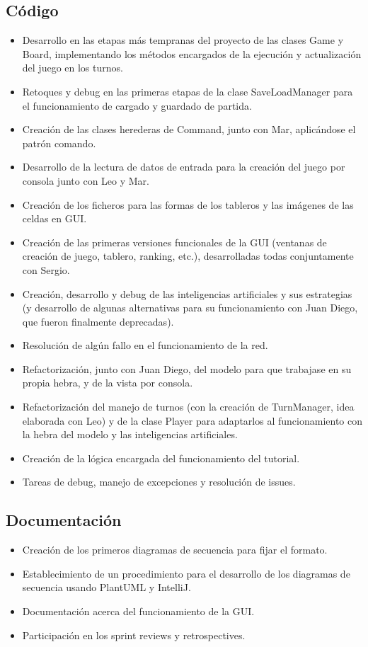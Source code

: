 \documentclass[../FINAL/Scrum/SCRUM.tex]{subfiles}
\begin{document}
\subsection*{Código}
\begin{itemize}
\item Desarrollo en las etapas más tempranas del proyecto de las clases Game y Board, implementando los métodos encargados de la ejecución y actualización del juego en los turnos.
\item Retoques y debug en las primeras etapas de la clase SaveLoadManager para el funcionamiento de cargado y guardado de partida.
\item Creación de las clases herederas de Command, junto con Mar, aplicándose el patrón comando.
\item Desarrollo de la lectura de datos de entrada para la creación del juego por consola junto con Leo y Mar.
\item Creación de los ficheros para las formas de los tableros y las imágenes de las celdas en GUI.
\item Creación de las primeras versiones funcionales de la GUI  (ventanas de creación de juego, tablero, ranking, etc.), desarrolladas todas conjuntamente con Sergio.
\item Creación, desarrollo y debug de las inteligencias artificiales y sus estrategias (y desarrollo de algunas alternativas para su funcionamiento con Juan Diego, que fueron finalmente deprecadas).
\item Resolución de algún fallo en el funcionamiento de la red.
\item Refactorización, junto con Juan Diego, del modelo para que trabajase en su propia hebra, y de la vista por consola.
\item Refactorización del manejo de turnos (con la creación de TurnManager, idea elaborada con Leo) y de la clase Player para adaptarlos al funcionamiento con la hebra del modelo y las inteligencias artificiales.
\item Creación de la lógica encargada del funcionamiento del tutorial.
\item Tareas de debug, manejo de excepciones y resolución de issues.
\end{itemize}

\subsection*{Documentación}
\begin{itemize}
\item Creación de los primeros diagramas de secuencia para fijar el formato.
\item Establecimiento de un procedimiento para el desarrollo de los diagramas de secuencia usando PlantUML y IntelliJ.
\item Documentación acerca del funcionamiento de la GUI.
\item Participación en los sprint reviews y retrospectives.

\end{itemize}
\end{document}
